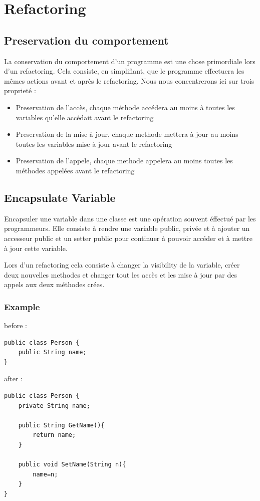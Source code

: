 \documentclass[a4paper, 10pt]{article}
\begin{document}
\newpage
\section{Refactoring}

\subsection{Preservation du comportement}
La conservation du comportement d'un programme est une chose primordiale lors d'un refactoring. Cela consiste, en simplifiant, que le programme effectuera les mêmes actions avant et après le refactoring. Nous nous concentrerons ici sur trois proprieté :

\begin{itemize}
\item Preservation de l'accès, chaque méthode accédera au moins à toutes les variables qu'elle accédait avant le refactoring
\item Preservation de la mise à jour, chaque methode mettera à jour au moins toutes les variables mise à jour avant le refactoring
\item Preservation de l'appele, chaque methode appelera au moins toutes les méthodes appelées avant le refactoring
\end{itemize}

\subsection{Encapsulate Variable}

Encapsuler une variable dans une classe est une opération souvent éffectué par les programmeurs. 
Elle consiste à rendre une variable public, privée et à ajouter un accesseur public et un setter public pour continuer à pouvoir accéder et à mettre à jour cette variable.

Lors d'un refactoring cela consiste à changer la visibility de la variable, créer deux nouvelles methodes et changer tout les accès et les mise à jour par des appels aux deux méthodes crées.

\subsubsection{Example}

before :
\begin{lstlisting}[frame=single]
public class Person {
	public String name;
}
\end{lstlisting}
after :
\begin{lstlisting}[frame=single]
public class Person {
	private String name;
	
	public String GetName(){
		return name;
	}

	public void SetName(String n){
		name=n;
	}
}
\end{lstlisting}
\end{document}
